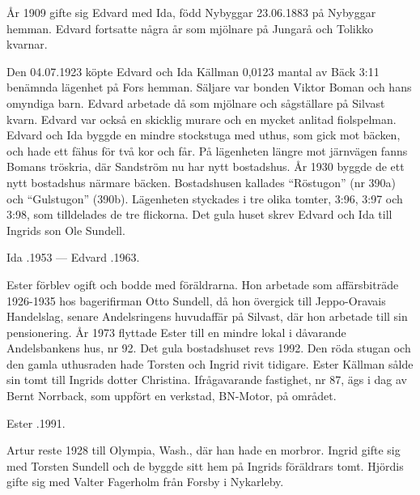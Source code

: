 År 1909 gifte sig Edvard med Ida, född Nybyggar 23.06.1883 på Nybyggar hemman. Edvard fortsatte några år som mjölnare på Jungarå och Tolikko kvarnar.
\begin{jhchildren}
  \item {}
  \item {}
\end{jhchildren}
Den 04.07.1923 köpte Edvard och Ida Källman 0,0123 mantal av Bäck 3:11 benämnda lägenhet på Fors hemman. Säljare var bonden Viktor Boman och hans omyndiga barn. Edvard arbetade då som mjölnare och sågställare på Silvast kvarn. Edvard var också en skicklig murare och en mycket anlitad fiolspelman. Edvard och Ida byggde en mindre stockstuga	med uthus, som gick mot bäcken, och hade ett fähus för två kor och får. På lägenheten längre mot järnvägen fanns Bomans tröskria, där 	Sandström nu har nytt bostadshus. År 1930 byggde de ett nytt bostadshus närmare bäcken. Bostadshusen kallades ``Röstugon'' (nr 390a) och 	``Gulstugon'' (390b). Lägenheten styckades i tre olika tomter, 3:96, 3:97 och 	3:98, som tilldelades de tre flickorna. Det gula huset skrev Edvard och Ida till Ingrids son Ole Sundell.

Ida .1953 --- Edvard .1963.

Ester förblev ogift och bodde med föräldrarna. Hon arbetade som affärsbiträde 1926-1935 hos bagerifirman Otto Sundell, då hon övergick till Jeppo-Oravais Handelslag, senare Andelsringens huvudaffär på Silvast, där hon arbetade till sin pensionering. År 1973 flyttade Ester till en mindre lokal i dåvarande Andelsbankens hus, nr 92. Det gula bostadshuset revs 1992. Den röda stugan och den gamla uthusraden hade Torsten och Ingrid rivit tidigare. Ester Källman sålde sin tomt till Ingrids dotter Christina. Ifrågavarande fastighet, nr 87, ägs i dag av Bernt Norrback, som uppfört en verkstad, BN-Motor, på området.

Ester .1991.

Artur reste 1928 till Olympia, Wash., där han hade en morbror. Ingrid gifte sig med Torsten Sundell och de byggde sitt hem på Ingrids föräldrars tomt. Hjördis gifte sig med Valter Fagerholm från Forsby i Nykarleby.



%



